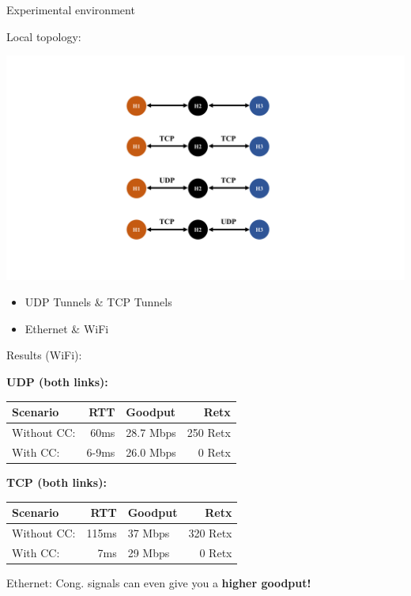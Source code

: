 \begin{frame}{Experimental environment}

Local topology:

\includegraphics[width=\linewidth]{../figs/Figure_3.pdf}

\begin{itemize}
\item UDP Tunnels \& TCP Tunnels
\item Ethernet \& WiFi
\end{itemize}

\end{frame}


\begin{frame}{Results (WiFi):}

\textbf{UDP (both links):}\\[.3em]
\begin{tabular}{ l r l r }
\toprule
\textbf{Scenario} & \textbf{RTT}	& \textbf{Goodput} & \textbf{Retx} \\
\midrule
Without CC: & 60ms 	& 28.7 Mbps	 & 250 Retx \\
With CC: & 6-9ms 		& 26.0 Mbps		 & 0 Retx \\
\bottomrule
\end{tabular}

\pause
\vspace*{1em}

\textbf{TCP (both links):}\\[.3em]
\begin{tabular}{ l r l r }
\toprule
\textbf{Scenario} & \textbf{RTT}	& \textbf{Goodput} & \textbf{Retx} \\
\midrule
Without CC: & 115ms 	& 37 Mbps	 & 320 Retx \\
With CC: 		& 	7ms  	& 29 Mbps	 & 0 Retx \\
\bottomrule
\end{tabular}

\vspace*{1em}

\pause
Ethernet: Cong. signals can even give you a \textbf{higher goodput!}

\end{frame}


